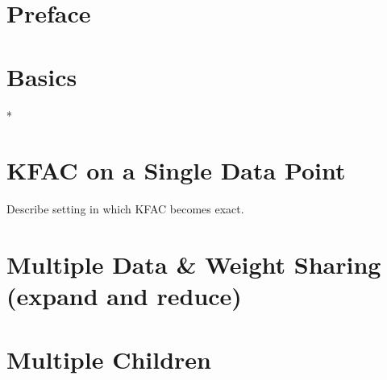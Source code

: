 \documentclass{article}
\begin{document}
\onecolumn


\clearpage

\tableofcontents
\clearpage

\section{Preface}

\clearpage

\begin{paracol}{2}
  \section{Basics}
  

  \switchcolumn[0]*
  \section{KFAC on a Single Data Point}
  \begin{test}[KFAC]
    Describe setting in which KFAC becomes exact.
  \end{test}

  \section{Multiple Data \& Weight Sharing (expand and reduce)}

  \section{Multiple Children}
\end{paracol}

\clearpage


\appendix
\end{document}
